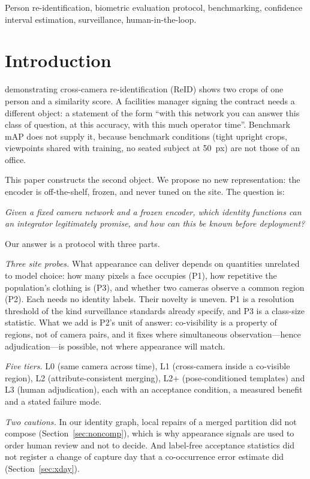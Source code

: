 \documentclass[journal]{IEEEtran}
\begin{document}
\begin{IEEEkeywords}
Person re-identification, biometric evaluation protocol, benchmarking, confidence interval estimation, surveillance, human-in-the-loop.
\end{IEEEkeywords}

\section{Introduction}
 demonstrating cross-camera re-identification (ReID) shows two crops of one person and a similarity score. A facilities manager signing the contract needs a different object: a statement of the form ``with this network you can answer this class of question, at this accuracy, with this much operator time''. Benchmark mAP does not supply it, because benchmark conditions (tight upright crops, viewpoints shared with training, no seated subject at 50~px) are not those of an office.

This paper constructs the second object. We propose no new representation: the encoder is off-the-shelf, frozen, and never tuned on the site. The question is:

\emph{Given a fixed camera network and a frozen encoder, which identity functions can an integrator legitimately promise, and how can this be known before deployment?}

Our answer is a protocol with three parts.

\emph{Three site probes.} What appearance can deliver depends on quantities unrelated to model choice: how many pixels a face occupies (P1), how repetitive the population's clothing is (P3), and whether two cameras observe a common region (P2). Each needs no identity labels. Their novelty is uneven. P1 is a resolution threshold of the kind surveillance standards already specify, and P3 is a class-size statistic. What we add is P2's unit of answer: co-visibility is a property of regions, not of camera pairs, and it fixes where simultaneous observation---hence adjudication---is possible, not where appearance will match.

\emph{Five tiers.} L0 (same camera across time), L1 (cross-camera inside a co-visible region), L2 (attribute-consistent merging), L2+ (pose-conditioned templates) and L3 (human adjudication), each with an acceptance condition, a measured benefit and a stated failure mode.

\emph{Two cautions.} In our identity graph, local repairs of a merged partition did not compose (Section~\ref{sec:noncomp}), which is why appearance signals are used to order human review and not to decide. And label-free acceptance statistics did not register a change of capture day that a co-occurrence error estimate did (Section~\ref{sec:xday}).
\end{document}
